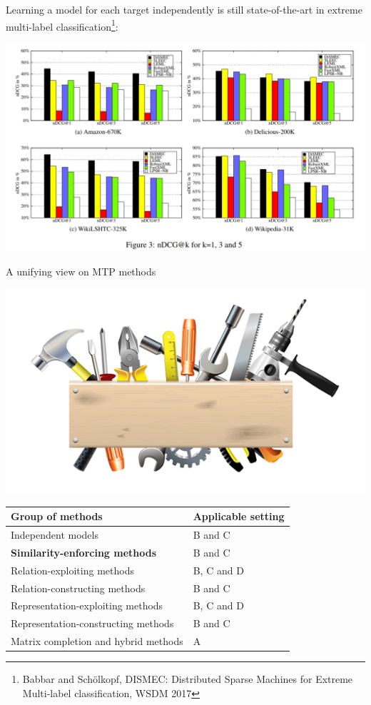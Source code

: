 \documentclass[]{beamer}
\renewcommand{\alert}[1]{\textbf{\color{putblue} #1}}
\begin{document}
\begin{frame}

\begin{center}
Learning a model for each target independently is still state-of-the-art in extreme multi-label classification\footnote{Babbar and Sch\"olkopf, DISMEC: Distributed Sparse Machines for Extreme Multi-label classification, WSDM 2017}:

\includegraphics[scale=0.3]{Figures/dismec} 
\end{center}

\end{frame}

\begin{frame}{A unifying view on MTP methods}

\begin{center}
\includegraphics[scale=0.3]{pics/tools}

\begin{tabular}{ll}
\hline
Group of methods & Applicable setting \\
\hline
\hline
Independent models & B and C \\
\alert{Similarity-enforcing methods} & B and C   \\ 
Relation-exploiting methods & B, C and D  \\
Relation-constructing methods & B and C \\
Representation-exploiting methods & B, C and D \\
Representation-constructing methods & B and C \\
Matrix completion and hybrid methods & A \\
\hline  
\end{tabular}
\end{center}
\end{frame}
\end{document}
